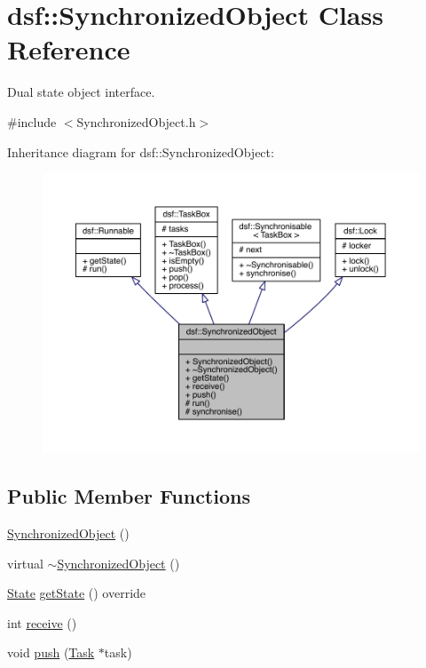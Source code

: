 \hypertarget{classdsf_1_1_synchronized_object}{}\section{dsf\+:\+:Synchronized\+Object Class Reference}
\label{classdsf_1_1_synchronized_object}


Dual state object interface.  




{\ttfamily \#include $<$Synchronized\+Object.\+h$>$}



Inheritance diagram for dsf\+:\+:Synchronized\+Object\+:\nopagebreak
\begin{figure}[H]
\begin{center}
\leavevmode
\includegraphics[width=350pt]{classdsf_1_1_synchronized_object__inherit__graph}
\end{center}
\end{figure}
\subsection*{Public Member Functions}
\begin{DoxyCompactItemize}
\item 
\hyperlink{classdsf_1_1_synchronized_object_a3f1d2def677e6d814de4d0bd2aa3d95b}{Synchronized\+Object} ()
\item 
virtual \hyperlink{classdsf_1_1_synchronized_object_ac7e50befb4b96229443037be154f1368}{$\sim$\+Synchronized\+Object} ()
\item 
\hyperlink{classdsf_1_1_runnable_a8eb63b21a0accc7a6a2a05f18e257991}{State} \hyperlink{classdsf_1_1_synchronized_object_a744c49c3f58728492b97a167e2d83d02}{get\+State} () override
\item 
int \hyperlink{classdsf_1_1_synchronized_object_a3ce496c6aaecc4b0ca3a4d09539a4920}{receive} ()
\item 
void \hyperlink{classdsf_1_1_synchronized_object_a3ae8eb719665a55365412a85647d299b}{push} (\hyperlink{classdsf_1_1_task}{Task} $\ast$task)
\end{DoxyCompactItemize}
